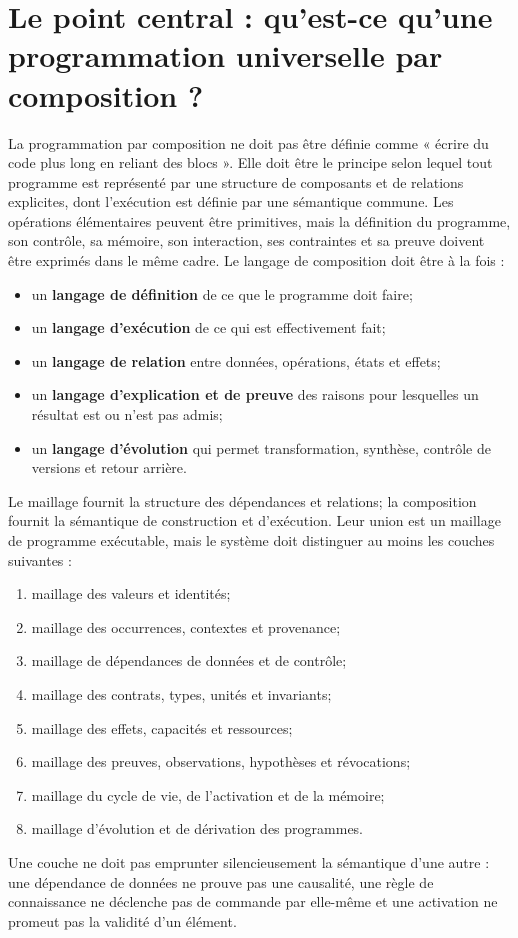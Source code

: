 \documentclass[11pt,a4paper]{article}
\begin{document}
\section{Le point central : qu'est-ce qu'une programmation universelle par composition ?}
La programmation par composition ne doit pas être définie comme « écrire du code plus long en reliant des blocs ». Elle doit être le principe selon lequel tout programme est représenté par une structure de composants et de relations explicites, dont l'exécution est définie par une sémantique commune. Les opérations élémentaires peuvent être primitives, mais la définition du programme, son contrôle, sa mémoire, son interaction, ses contraintes et sa preuve doivent être exprimés dans le même cadre. Le langage de composition doit être à la fois :
\begin{itemize}
\item un \textbf{langage de définition} de ce que le programme doit faire;
\item un \textbf{langage d'exécution} de ce qui est effectivement fait;
\item un \textbf{langage de relation} entre données, opérations, états et effets;
\item un \textbf{langage d'explication et de preuve} des raisons pour lesquelles un résultat est ou n'est pas admis;
\item un \textbf{langage d'évolution} qui permet transformation, synthèse, contrôle de versions et retour arrière.
\end{itemize}

Le maillage fournit la structure des dépendances et relations; la composition fournit la sémantique de construction et d'exécution. Leur union est un maillage de programme exécutable, mais le système doit distinguer au moins les couches suivantes :
\begin{enumerate}
\item maillage des valeurs et identités;
\item maillage des occurrences, contextes et provenance;
\item maillage de dépendances de données et de contrôle;
\item maillage des contrats, types, unités et invariants;
\item maillage des effets, capacités et ressources;
\item maillage des preuves, observations, hypothèses et révocations;
\item maillage du cycle de vie, de l'activation et de la mémoire;
\item maillage d'évolution et de dérivation des programmes.
\end{enumerate}
Une couche ne doit pas emprunter silencieusement la sémantique d'une autre : une dépendance de données ne prouve pas une causalité, une règle de connaissance ne déclenche pas de commande par elle-même et une activation ne promeut pas la validité d'un élément.
\end{document}
